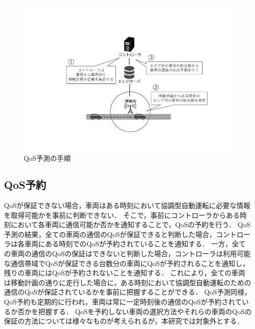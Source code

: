 \documentclass[a4paper,10pt,twocolumn,uplatex]{jsarticle}
\begin{document}
\begin{figure}[t]
	\begin{centering}
    \includegraphics[width=\linewidth]{img/VirtualizationQoSPrediction.pdf}
    \caption{QoS予測の手順}
    \label{fig:QoSprediction}
    \end{centering}
\end{figure}

\subsection{QoS予約}
QoSが保証できない場合，車両はある時刻において協調型自動運転に必要な情報を取得可能かを事前に判断できない．
そこで，事前にコントローラからある時刻において各車両に通信可能か否かを通知することで，QoSの予約を行う．
QoS予測の結果，全ての車両の通信のQoSが保証できると判断した場合，コントローラは各車両にある時刻でのQoSが予約されていることを通知する．
一方，全ての車両の通信のQoSの保証はできないと判断した場合，コントローラは利用可能な通信帯域でQoSが保証できる台数分の車両にQoSが予約されることを通知し，残りの車両にはQoSが予約されないことを通知する．
これにより，全ての車両は移動計画の通りに走行した場合に，ある時刻において協調型自動運転のための通信のQoSが保証されているかを事前に把握することができる．
QoS予測同様，QoS予約も定期的に行われ，車両は常に一定時刻後の通信のQoSが予約されているか否かを把握する．
QoSを予約しない車両の選択方法やそれらの車両のQoSの保証の方法については様々なものが考えられるが，本研究では対象外とする．

\end{document}
